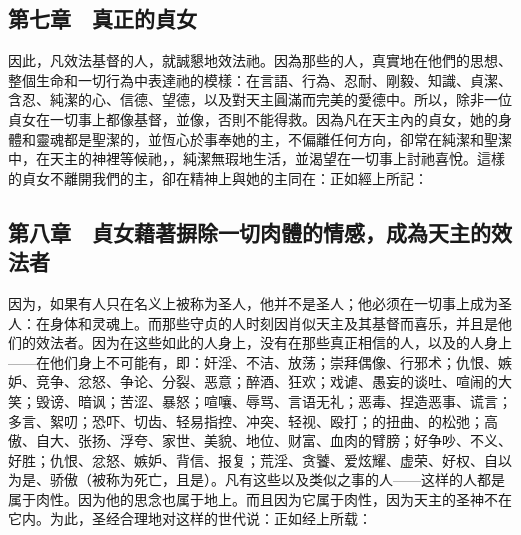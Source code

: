 
\subsection{第七章　真正的貞女}

因此，凡效法基督的人，就誠懇地效法祂。因為那些的人，真實地在他們的思想、整個生命和一切行為中表達祂的模樣：在言語、行為、忍耐、剛毅、知識、貞潔、含忍、純潔的心、信德、望德，以及對天主圓滿而完美的愛德中。所以，除非一位貞女在一切事上都像基督，並像，否則不能得救。因為凡在天主內的貞女，她的身體和靈魂都是聖潔的，並恆心於事奉她的主，不偏離任何方向，卻常在純潔和聖潔中，在天主的神裡等候祂，，純潔無瑕地生活，並渴望在一切事上討祂喜悅。這樣的貞女不離開我們的主，卻在精神上與她的主同在：正如經上所記：\par


\subsection{第八章　貞女藉著摒除一切肉體的情感，成為天主的效法者}

因为，如果有人只在名义上被称为圣人，他并不是圣人；他必须在一切事上成为圣人：在身体和灵魂上。而那些守贞的人时刻因肖似天主及其基督而喜乐，并且是他们的效法者。因为在这些如此的人身上，没有在那些真正相信的人，以及的人身上——在他们身上不可能有，即：奸淫、不洁、放荡；崇拜偶像、行邪术；仇恨、嫉妒、竞争、忿怒、争论、分裂、恶意；醉酒、狂欢；戏谑、愚妄的谈吐、喧闹的大笑；毁谤、暗讽；苦涩、暴怒；喧嚷、辱骂、言语无礼；恶毒、捏造恶事、谎言；多言、絮叨；恐吓、切齿、轻易指控、冲突、轻视、殴打；的扭曲、的松弛；高傲、自大、张扬、浮夸、家世、美貌、地位、财富、血肉的臂膀；好争吵、不义、好胜；仇恨、忿怒、嫉妒、背信、报复；荒淫、贪饕、爱炫耀、虚荣、好权、自以为是、骄傲（被称为死亡，且是）。凡有这些以及类似之事的人——这样的人都是属于肉性。因为他的思念也属于地上。而且因为它属于肉性，因为天主的圣神不在它内。为此，圣经合理地对这样的世代说：正如经上所载：\par

